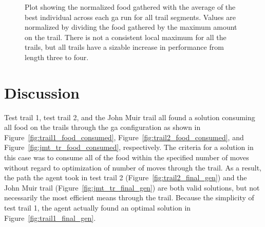 \begin{figure}[hbt]
\centering
{}
\caption[Mean Food Gathered on All Segments with Varying Delay Line Length]{Plot showing the normalized food gathered with the average of the best individual across each \gls{ga} run for all trail segments. Values are normalized by dividing the food gathered by the maximum amount on the trail. There is not a consistent local maximum for all the trails, but all trails have a sizable increase in performance from length three to four.}
\label{fig:sft_all_sweep_no_std}
\end{figure}


\clearpage
\section{Discussion}
Test trail 1, test trail 2, and the John Muir trail all found a solution consuming all food on the trails through the \gls{ga} configuration as shown in Figure~\ref{fig:trail1_food_consumed}, Figure~\ref{fig:trail2_food_consumed}, and Figure~\ref{fig:jmt_tr_food_consumed}, respectively. The criteria for a solution in this case was to consume all of the food within the specified number of moves without regard to optimization of number of moves through the trail. As a result, the path the agent took in test trail 2 (Figure~\ref{fig:trail2_final_gen}) and the John Muir trail (Figure~\ref{fig:jmt_tr_final_gen}) are both valid solutions, but not necessarily the most efficient means through the trail. Because the simplicity of test trail 1, the agent actually found an optimal solution in Figure~\ref{fig:trail1_final_gen}.

